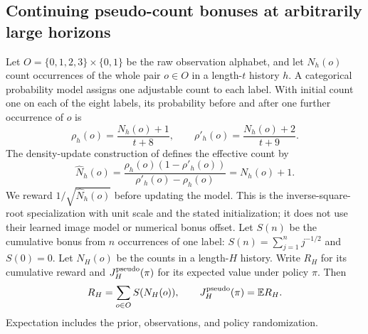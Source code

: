 \subsection{Continuing pseudo-count bonuses at arbitrarily large horizons}
Let $O=\{0,1,2,3\}\times\{0,1\}$ be the raw observation alphabet, and
let $N_h(o)$ count occurrences of the whole pair $o\in O$ in a length-$t$
history $h$. A categorical probability model assigns one adjustable count
to each label. With initial count one on each of the eight labels, its probability
before and after one further occurrence of $o$ is
\[
 \rho_h(o)=\frac{N_h(o)+1}{t+8},\qquad
 \rho'_h(o)=\frac{N_h(o)+2}{t+9}.
\]
The density-update construction of \citet[Equations (1)--(2)]{bellemare2016unifying}
defines the effective count by
\[
 \widehat N_h(o)=\frac{\rho_h(o)(1-\rho'_h(o))}{\rho'_h(o)-\rho_h(o)}
               =N_h(o)+1.
\]
We reward $1/\sqrt{\widehat N_h(o)}$ before updating the model. This is the
inverse-square-root specialization with unit scale and the stated initialization;
it does not use their learned image model or numerical bonus offset. Let $S(n)$
be the cumulative bonus from $n$ occurrences of one label:
$S(n)=\sum_{j=1}^n j^{-1/2}$ and $S(0)=0$. Let $N_H(o)$ be the counts in a
length-$H$ history. Write $R_H$ for its cumulative reward and
$J_H^{\rm pseudo}(\pi)$ for its expected value under policy $\pi$. Then
\[
 R_H=\sum_{o\in O} S(N_{H}(o)),\qquad J_H^{\rm pseudo}(\pi)=\mathbb E R_H.
\]
Expectation includes the prior, observations, and policy randomization.

